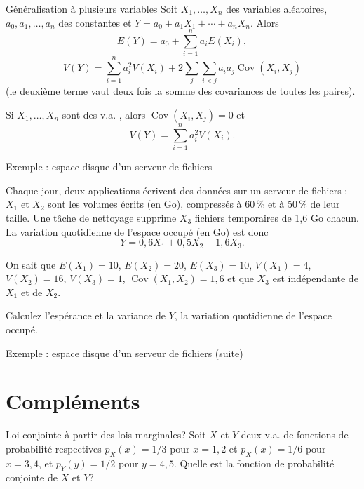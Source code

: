 \documentclass{BeamerTemplate}
\newcommand{\cibleReponse}{}
\newcommand{\lienreponse}[1]{\gdef\cibleReponse{#1}}
\newcommand{\Cov}{\operatorname{Cov}}
\begin{document}
\begin{frame}[t]{Généralisation à plusieurs variables}
Soit $X_1,\ldots,X_n$ des variables aléatoires, $a_0,a_1,\ldots,a_n$ des constantes et
$Y=a_0+a_1X_1+\cdots+a_nX_n$. Alors
$$E(Y)=a_0+\sum_{i=1}^na_iE(X_i),$$
$$V(Y) =\sum_{i=1}^na_i^2V(X_i)+2\sum\limits_{j}\sum\limits_{i<j}a_ia_j\Cov(X_i,X_j)$$
{\small (le deuxième terme vaut deux fois la somme des covariances de toutes les paires).}

\vspace{0.1in}
Si $X_1,\ldots,X_n$ sont des v.a. , alors $\Cov(X_i,X_j)=0$ et
$$V(Y)=\sum_{i=1}^na_i^2V(X_i).$$

\end{frame}


\begin{frame}[t,label=exdisque]{Exemple : espace disque d'un serveur de fichiers}

{\small
Chaque jour, deux applications écrivent des données sur un serveur de fichiers : $X_1$ et $X_2$
sont les volumes écrits (en Go), compressés à 60\,\% et à 50\,\% de leur taille. Une tâche de
nettoyage supprime $X_3$ fichiers temporaires de 1,6 Go chacun. La variation quotidienne de l'espace
occupé (en Go) est donc
$$Y=0{,}6X_1+0{,}5X_2-1{,}6X_3.$$

On sait que $E(X_1)=10$, $E(X_2)=20$, $E(X_3)=10$, $V(X_1)=4$, $V(X_2)=16$, $V(X_3)=1$,
$\Cov(X_1,X_2)=1{,}6$ et que $X_3$ est indépendante de $X_1$ et de $X_2$.

\vspace{0.1in}
Calculez l'espérance et la variance de $Y$, la variation quotidienne de l'espace occupé.
}
\lienreponse{rep-ex2}
\end{frame}


\begin{frame}[t]{Exemple : espace disque d'un serveur de fichiers (suite)}

\lienreponse{rep-ex2}
\end{frame}

\section{Compléments}

\begin{frame}[t,label=exautre]{Loi conjointe à partir des lois marginales?}
Soit $X$ et $Y$ deux v.a. de fonctions de probabilité respectives $p_X(x)=1/3$ pour $x=1,2$ et
$p_X(x)=1/6$ pour $x=3,4$, et $p_Y(y)=1/2$ pour $y=4,5$. Quelle est la fonction de probabilité
conjointe de $X$ et $Y$?

\lienreponse{rep-ex2}
\end{frame}
\end{document}
